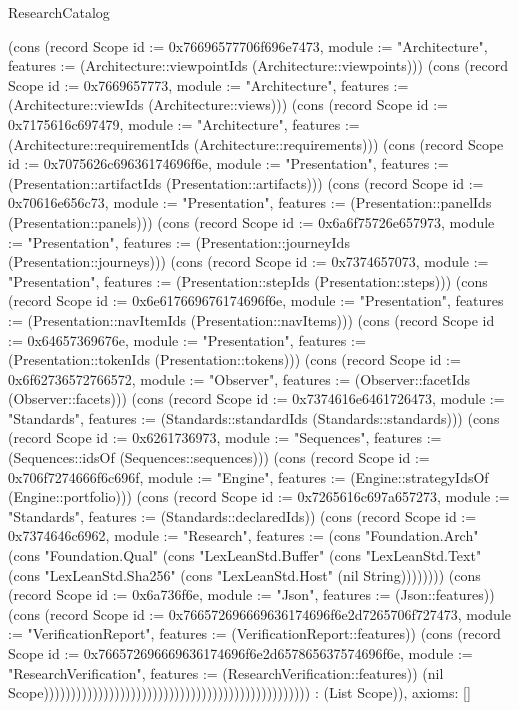 \begin{lexlean}{ResearchCatalog}
\begin{semanticmodule}
{    (cons (record Scope {id := 0x76696577706f696e7473, module := "Architecture", features := (Architecture::viewpointIds (Architecture::viewpoints))})
    (cons (record Scope {id := 0x7669657773, module := "Architecture", features := (Architecture::viewIds (Architecture::views))})
    (cons (record Scope {id := 0x7175616c697479, module := "Architecture", features := (Architecture::requirementIds (Architecture::requirements))})
    (cons (record Scope {id := 0x7075626c69636174696f6e, module := "Presentation", features := (Presentation::artifactIds (Presentation::artifacts))})
    (cons (record Scope {id := 0x70616e656c73, module := "Presentation", features := (Presentation::panelIds (Presentation::panels))})
    (cons (record Scope {id := 0x6a6f75726e657973, module := "Presentation", features := (Presentation::journeyIds (Presentation::journeys))})
    (cons (record Scope {id := 0x7374657073, module := "Presentation", features := (Presentation::stepIds (Presentation::steps))})
    (cons (record Scope {id := 0x6e617669676174696f6e, module := "Presentation", features := (Presentation::navItemIds (Presentation::navItems))})
    (cons (record Scope {id := 0x64657369676e, module := "Presentation", features := (Presentation::tokenIds (Presentation::tokens))})
    (cons (record Scope {id := 0x6f62736572766572, module := "Observer", features := (Observer::facetIds (Observer::facets))})
    (cons (record Scope {id := 0x7374616e6461726473, module := "Standards", features := (Standards::standardIds (Standards::standards))})
    (cons (record Scope {id := 0x6261736973, module := "Sequences", features := (Sequences::idsOf (Sequences::sequences))})
    (cons (record Scope {id := 0x706f7274666f6c696f, module := "Engine", features := (Engine::strategyIdsOf (Engine::portfolio))})
    (cons (record Scope {id := 0x7265616c697a657273, module := "Standards", features := (Standards::declaredIds)})
    (cons (record Scope {id := 0x7374646c6962, module := "Research", features := (cons "Foundation.Arch" (cons "Foundation.Qual" (cons "LexLeanStd.Buffer" (cons "LexLeanStd.Text" (cons "LexLeanStd.Sha256" (cons "LexLeanStd.Host" (nil String)))))))})
    (cons (record Scope {id := 0x6a736f6e, module := "Json", features := (Json::features)}) (cons (record Scope {id := 0x766572696669636174696f6e2d7265706f727473, module := "VerificationReport", features := (VerificationReport::features)}) (cons (record Scope {id := 0x766572696669636174696f6e2d657865637574696f6e, module := "ResearchVerification", features := (ResearchVerification::features)}) (nil Scope))))))))))))))))))))))))))))))))))))))))))))))))) : (List Scope)),
  axioms: []
}


\end{semanticmodule}
\end{lexlean}
